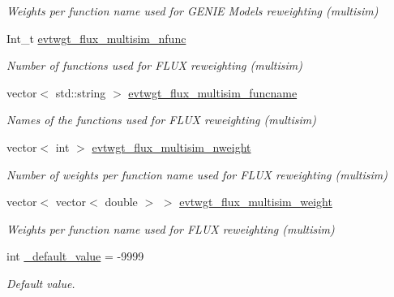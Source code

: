 \begin{DoxyCompactItemize}
\begin{DoxyCompactList}\small\item\em Weights per function name used for G\-E\-N\-I\-E Models reweighting (multisim) \end{DoxyCompactList}\item 
\hypertarget{classUBXSecEvent_abcfe89b2434fdd4bf0f6a355daf5ec25}{Int\-\_\-t \hyperlink{classUBXSecEvent_abcfe89b2434fdd4bf0f6a355daf5ec25}{evtwgt\-\_\-flux\-\_\-multisim\-\_\-nfunc}}\label{classUBXSecEvent_abcfe89b2434fdd4bf0f6a355daf5ec25}

\begin{DoxyCompactList}\small\item\em Number of functions used for F\-L\-U\-X reweighting (multisim) \end{DoxyCompactList}\item 
\hypertarget{classUBXSecEvent_a0db02848f5839fd1d18a8190546d0e4b}{vector$<$ std\-::string $>$ \hyperlink{classUBXSecEvent_a0db02848f5839fd1d18a8190546d0e4b}{evtwgt\-\_\-flux\-\_\-multisim\-\_\-funcname}}\label{classUBXSecEvent_a0db02848f5839fd1d18a8190546d0e4b}

\begin{DoxyCompactList}\small\item\em Names of the functions used for F\-L\-U\-X reweighting (multisim) \end{DoxyCompactList}\item 
\hypertarget{classUBXSecEvent_af868d81fdf37d21fa8a2731a0b5bc1b8}{vector$<$ int $>$ \hyperlink{classUBXSecEvent_af868d81fdf37d21fa8a2731a0b5bc1b8}{evtwgt\-\_\-flux\-\_\-multisim\-\_\-nweight}}\label{classUBXSecEvent_af868d81fdf37d21fa8a2731a0b5bc1b8}

\begin{DoxyCompactList}\small\item\em Number of weights per function name used for F\-L\-U\-X reweighting (multisim) \end{DoxyCompactList}\item 
\hypertarget{classUBXSecEvent_a54a709ff8e83a3c51ef37bba7f4bcf36}{vector$<$ vector$<$ double $>$ $>$ \hyperlink{classUBXSecEvent_a54a709ff8e83a3c51ef37bba7f4bcf36}{evtwgt\-\_\-flux\-\_\-multisim\-\_\-weight}}\label{classUBXSecEvent_a54a709ff8e83a3c51ef37bba7f4bcf36}

\begin{DoxyCompactList}\small\item\em Weights per function name used for F\-L\-U\-X reweighting (multisim) \end{DoxyCompactList}\item 
\hypertarget{classUBXSecEvent_a88e5ff2c7d0db95750e980740231d80b}{int \hyperlink{classUBXSecEvent_a88e5ff2c7d0db95750e980740231d80b}{\-\_\-default\-\_\-value} = -\/9999}\label{classUBXSecEvent_a88e5ff2c7d0db95750e980740231d80b}

\begin{DoxyCompactList}\small\item\em Default value. \end{DoxyCompactList}\end{DoxyCompactItemize}


